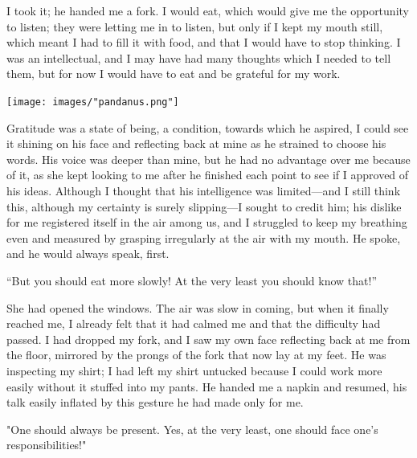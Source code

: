 \documentclass[
]{memoir}
\newlength{\drop}%
\begin{document}
I took it; he handed me a fork. I would eat, which would give me the
opportunity to listen; they were letting me in to listen, but only if I
kept my mouth still, which meant I had to fill it with food, and that I
would have to stop thinking. I was an intellectual, and I may have had
many thoughts which I needed to tell them, but for now I would have to
eat and be grateful for my work.

\begin{center}\texttt{[image: images/"pandanus.png"]}\end{center}

Gratitude was a state of being, a condition, towards which he aspired, I
could see it shining on his face and reflecting back at mine as he
strained to choose his words. His voice was deeper than mine, but he had
no advantage over me because of it, as she kept looking to me after he
finished each point to see if I approved of his ideas. Although I
thought that his intelligence was limited---and I still think this,
although my certainty is surely slipping---I sought to credit him; his
dislike for me registered itself in the air among us, and I struggled to
keep my breathing even and measured by grasping irregularly at the air
with my mouth. He spoke, and he would always speak, first.

``But you should eat more slowly! At the very least you should know
that!''

She had opened the windows. The air was slow in coming, but when it
finally reached me, I already felt that it had calmed me and that the
difficulty had passed. I had dropped my fork, and I saw my own face
reflecting back at me from the floor, mirrored by the prongs of the fork
that now lay at my feet. He was inspecting my shirt; I had left my shirt
untucked because I could work more easily without it stuffed into my
pants. He handed me a napkin and resumed, his talk easily inflated by
this gesture he had made only for me.

"One should always be present. Yes, at the very least, one should face
one's responsibilities!"
\end{document}
